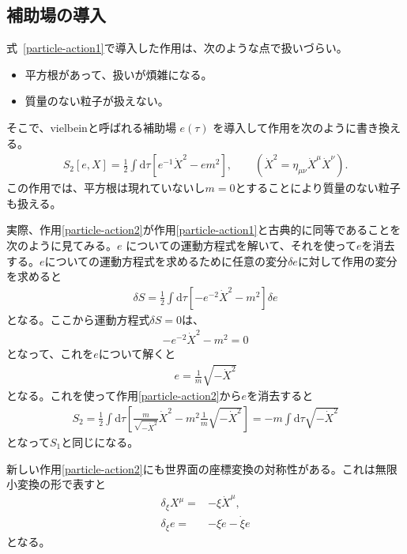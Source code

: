 \documentclass[report,paper=a4, fontsize=12pt, line_length=16cm, number_of_lines=33,dvipdfmx]{jlreq}
\numberwithin{equation}{chapter}
\numberwithin{equation}{section}
\newcommand{\di}{\mathrm{d}}
\begin{document}
\subsection{補助場の導入}
式~\eqref{particle-action1}で導入した作用は、次のような点で扱いづらい。
\begin{itemize}
 \item 平方根があって、扱いが煩雑になる。
 \item 質量のない粒子が扱えない。
\end{itemize}
そこで、vielbeinと呼ばれる補助場 $e(\tau)$ を導入して作用を次のように書き換える。
\begin{align}
 S_{2}[e,X]=\frac12 \int \di \tau\left[
e^{-1}\dot{X}^2-em^2
\right],\qquad (\dot{X}^2=\eta_{\mu\nu}\dot{X}^{\mu}\dot{X}^{\nu}).
\label{particle-action2}
\end{align}
この作用では、平方根は現れていないし$m=0$とすることにより質量のない粒子も扱える。

実際、作用\eqref{particle-action2}が作用\eqref{particle-action1}と古典的に同等であることを次のように見てみる。$e$ についての運動方程式を解いて、それを使って$e$を消去する。$e$についての運動方程式を求めるために任意の変分$\delta e$に対して作用の変分を求めると
\begin{align}
 \delta S=\frac12 \int \di \tau\left[
-e^{-2}\dot{X}^2-m^2
\right]\delta e
\end{align}
となる。ここから運動方程式$\delta S=0$は、
\begin{align}
 -e^{-2}\dot{X}^2-m^2=0
\end{align}
となって、これを$e$について解くと
\begin{align}
 e=\frac{1}{m}\sqrt{-\dot{X}^2}
\end{align}
となる。これを使って作用\eqref{particle-action2}から$e$を消去すると
\begin{align}
 S_2=\frac12\int \di \tau\left[
\frac{m}{\sqrt{-\dot{X}^2}}\dot{X}^2
-m^2\frac{1}{m}\sqrt{-\dot{X}^2}
\right]=-m\int \di \tau\sqrt{-\dot{X}^2}
\end{align}
となって$S_1$と同じになる。

新しい作用\eqref{particle-action2}にも世界面の座標変換の対称性がある。これは無限小変換の形で表すと
\begin{equation}
\begin{aligned}
 \delta_{\xi}X^{\mu}=&-\xi \dot{X}^{\mu},\\
\delta_{\xi}e=&-\xi \dot{e}-\dot{\xi} e
\end{aligned} \label{reparam2}
\end{equation}
となる。
\end{document}
